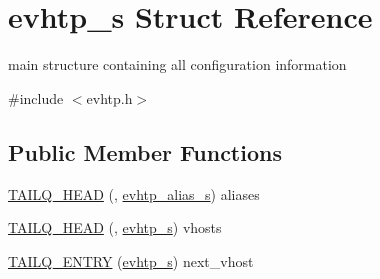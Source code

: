 \hypertarget{structevhtp__s}{\section{evhtp\-\_\-s Struct Reference}
\label{structevhtp__s}
}


main structure containing all configuration information  




{\ttfamily \#include $<$evhtp.\-h$>$}

\subsection*{Public Member Functions}
\begin{DoxyCompactItemize}
\item 
\hyperlink{structevhtp__s_a7c3276340515ffaf4c81acf83e74b488}{T\-A\-I\-L\-Q\-\_\-\-H\-E\-A\-D} (, \hyperlink{structevhtp__alias__s}{evhtp\-\_\-alias\-\_\-s}) aliases
\item 
\hyperlink{structevhtp__s_a671ea539b6cc9654bf0fa080a7197b0b}{T\-A\-I\-L\-Q\-\_\-\-H\-E\-A\-D} (, \hyperlink{structevhtp__s}{evhtp\-\_\-s}) vhosts
\item 
\hyperlink{structevhtp__s_a0559b45940aab93bfdcbb46b0c5fb0a1}{T\-A\-I\-L\-Q\-\_\-\-E\-N\-T\-R\-Y} (\hyperlink{structevhtp__s}{evhtp\-\_\-s}) next\-\_\-vhost
\end{DoxyCompactItemize}
